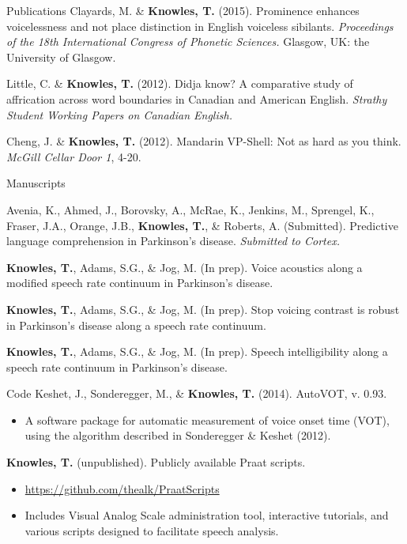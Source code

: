 \documentclass{resume} %
\begin{document}
\begin{rSection}{Publications}
Clayards, M. \& {\bf Knowles, T.} (2015). Prominence enhances voicelessness and not place distinction in English voiceless sibilants. \emph{Proceedings of the 18th International Congress of Phonetic Sciences.} Glasgow, UK: the University of Glasgow.

Little, C. \& {\bf Knowles, T.} (2012). Didja know? A comparative study of affrication across word boundaries in Canadian and American English. \emph{Strathy Student Working Papers on Canadian English.}

Cheng, J. \& {\bf Knowles, T.} (2012). Mandarin VP-Shell: Not as hard as you think. \emph{McGill Cellar Door 1}, 4-20.

\end{rSection}

\begin{rSection}{Manuscripts}

Avenia, K., Ahmed, J., Borovsky, A., McRae, K., Jenkins, M., Sprengel, K., Fraser, J.A., Orange, J.B., {\bf Knowles, T.}, \& Roberts, A. (Submitted). Predictive language comprehension in Parkinson’s disease. \emph{Submitted to Cortex.}

{\bf Knowles, T.}, Adams, S.G., \& Jog, M. (In prep). Voice acoustics along a modified speech rate continuum in Parkinson's disease.

{\bf Knowles, T.}, Adams, S.G., \& Jog, M. (In prep). Stop voicing contrast is robust in Parkinson's disease along a speech rate continuum.

{\bf Knowles, T.}, Adams, S.G., \& Jog, M. (In prep). Speech intelligibility along a speech rate continuum in Parkinson's disease.


\end{rSection}



\begin{rSection}{Code}
	Keshet, J., Sonderegger, M., \& {\bf Knowles, T.} (2014). AutoVOT, v. 0.93.
	\begin{itemize}
			\renewcommand\labelitemi{$\cdot$}
		\item A software package for automatic measurement of voice onset time (VOT), using the algorithm described in Sonderegger \& Keshet (2012).
	\end{itemize}
	
	{\bf Knowles, T.} (unpublished). Publicly available Praat scripts.
	\begin{itemize}
			\renewcommand\labelitemi{$\cdot$}
		\item \url{https://github.com/thealk/PraatScripts}
		\item Includes Visual Analog Scale administration tool, interactive tutorials, and various scripts designed to facilitate speech analysis.
	\end{itemize}
\end{rSection}
\end{document}

